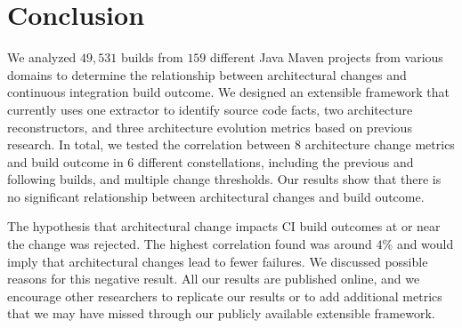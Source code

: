 \documentclass[sigplan, anonymous, review]{acmart}
\begin{document}
\section{Conclusion}

We analyzed $49,531$ builds from $159$ different Java Maven projects from various domains to determine the relationship between architectural changes and continuous integration build outcome.
We designed an extensible framework that currently uses one extractor to identify source code facts, two architecture reconstructors, and three architecture evolution metrics based on previous research.
In total, we tested the correlation between $8$ architecture change metrics and build outcome in $6$ different constellations, including the previous and following builds, and multiple change thresholds.
Our results show that there is no significant relationship between architectural changes and build outcome.

The hypothesis that architectural change impacts CI build outcomes at or near the change was rejected. The highest correlation found was around $4\%$ and would imply that architectural changes lead to fewer failures. 
We discussed possible reasons for this negative result.
All our results are published online, and we encourage other researchers to replicate our results or to add additional metrics that we may have missed through our publicly available extensible framework.



\end{document}
